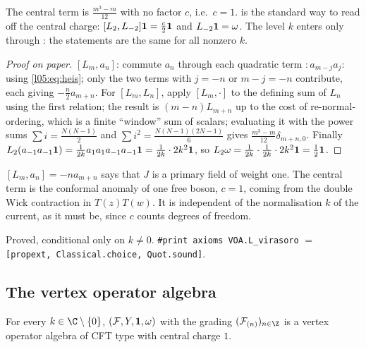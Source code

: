 \begin{dictionary}
The central term is $\frac{m^3-m}{12}$ with no factor $c$, i.e.\ $c=1$.  is the
standard way to read off the central charge: $[L_2,L_{-2}]\mathbf{1}=\frac c2\mathbf{1}$ and
$L_{-2}\mathbf{1}=\omega$. The level $k$ enters only through : the statements are the same for all
nonzero $k$.
\end{dictionary}

\begin{proof}[Proof on paper]
$[L_m,a_n]$: commute $a_n$ through each quadratic term ${:}a_{m-j}a_j{:}$ using \eqref{l05:eq:heis}; only
the two terms with $j=-n$ or $m-j=-n$ contribute, each giving $-\frac{n}{2}a_{m+n}$. For $[L_m,L_n]$, apply
$[L_m,\cdot]$ to the defining sum of $L_n$ using the first relation; the result is $(m-n)L_{m+n}$ up to the
cost of re-normal-ordering, which is a finite ``window'' sum of scalars; evaluating it with the power sums
$\sum i=\frac{N(N-1)}2$ and $\sum i^2=\frac{N(N-1)(2N-1)}6$ gives $\frac{m^3-m}{12}\delta_{m+n,0}$. Finally
$L_2(a_{-1}a_{-1}\mathbf{1})=\frac1{2k}a_1a_1a_{-1}a_{-1}\mathbf{1}=\frac1{2k}\cdot2k^2\mathbf{1}$, so
$L_2\omega=\frac1{2k}\cdot\frac1{2k}\cdot 2k^2\mathbf{1}=\frac12\mathbf{1}$.
\end{proof}

\begin{physics}
$[L_m,a_n]=-na_{m+n}$ says that $J$ is a primary field of weight one. The central term is the conformal
anomaly of one free boson, $c=1$, coming from the double Wick contraction in $T(z)T(w)$. It is independent
of the normalisation $k$ of the current, as it must be, since $c$ counts degrees of freedom.
\end{physics}

\begin{status}
Proved, conditional only on $k\neq0$. \texttt{\#print axioms VOA.L\_virasoro} $=$
\texttt{[propext, Classical.choice, Quot.sound]}.
\end{status}

\subsection{The vertex operator algebra}

\begin{theorem}\label{l05:thm:heisVOA}
For every $k\in\C\setminus\{0\}$, $(\mathcal{F},Y,\mathbf{1},\omega)$ with the grading
$(\lfiveF_{(n)})_{n\in\Z}$ is a vertex operator algebra of CFT type with central charge $1$.
\end{theorem}

